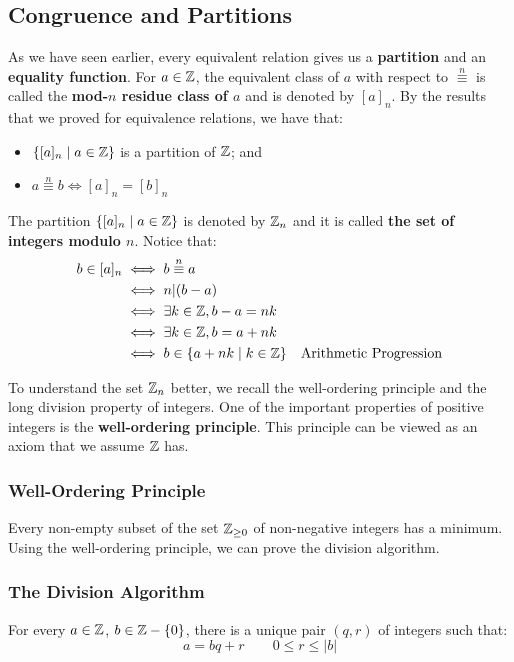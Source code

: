 \documentclass[letterpaper]{article}
\begin{document}
\subsection{Congruence and Partitions}
As we have seen earlier, every equivalent relation gives us a \textbf{partition} and an \textbf{equality function}. For $a \in \mathbb{Z}$, the equivalent class of $a$ with respect to $\overset{n}{\equiv}$ is called the \textbf{mod-$n$ residue class of $a$} and is denoted by $[a]_n$. By the results that we proved for equivalence relations, we have that:
\begin{itemize}
    \item $\{[a]_n \mid a \in \mathbb{Z}\}$ is a partition of $\mathbb{Z}$; and 
    \item $a \overset{n}{\equiv} b \iff [a]_n = [b]_n$ 
\end{itemize}
The partition $\{[a]_n \mid a \in \mathbb{Z}\}$ is denoted by $\mathbb{Z}_n$ and it is called \textbf{the set of integers modulo $n$}. Notice that:
\begin{equation*}
    \begin{aligned}
        b \in [a]_n &\iff b \overset{n}{\equiv} a \\ 
            &\iff n | (b - a) \\ 
            &\iff \exists k \in \mathbb{Z}, b - a = nk \\ 
            &\iff \exists k \in \mathbb{Z}, b = a + nk \\ 
            &\iff b \in \{a + nk \mid k \in \mathbb{Z}\} & \text{Arithmetic Progression}
    \end{aligned}
\end{equation*} 

To understand the set $\mathbb{Z}_n$ better, we recall the well-ordering principle and the long division property of integers. One of the important properties of positive integers is the \textbf{well-ordering principle}. This principle can be viewed as an axiom that we assume $\mathbb{Z}$ has. 

\subsubsection{Well-Ordering Principle}
Every non-empty subset of the set $\mathbb{Z}_{\geq 0}$ of non-negative integers has a minimum. Using the well-ordering principle, we can prove the division algorithm. 

\subsubsection{The Division Algorithm}
For every $a \in \mathbb{Z}$, $b \in \mathbb{Z} - \{0\}$, there is a unique pair $(q, r)$ of integers such that:
\[a = bq + r \qquad 0 \leq r \leq |b|\]
\end{document}
